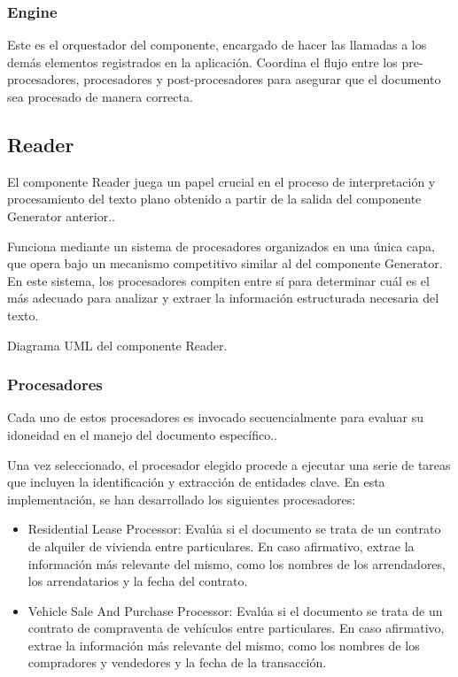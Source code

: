 \subsubsection*{Engine}
Este es el orquestador del componente, encargado de hacer las llamadas a los demás elementos registrados en la
aplicación. Coordina el flujo entre los pre-procesadores, procesadores y post-procesadores para asegurar que el
documento sea procesado de manera correcta.

\subsection*{Reader}
El componente Reader juega un papel crucial en el proceso de interpretación y procesamiento del texto plano obtenido a
partir de la salida del componente Generator anterior..

Funciona mediante un sistema de procesadores organizados en una única capa, que opera bajo un mecanismo competitivo
similar al del componente Generator. En este sistema, los procesadores compiten entre sí para determinar cuál es el más
adecuado para analizar y extraer la información estructurada necesaria del texto.

Diagrama UML del componente Reader.

\subsubsection*{Procesadores}
Cada uno de estos procesadores es invocado secuencialmente para evaluar su idoneidad en el manejo del documento
específico..

Una vez seleccionado, el procesador elegido procede a ejecutar una serie de tareas que incluyen la identificación y
extracción de entidades clave. En esta implementación, se han desarrollado los siguientes procesadores:

\begin{itemize}
    \item Residential Lease Processor: Evalúa si el documento se trata de un contrato de alquiler de vivienda entre
    particulares. En caso afirmativo, extrae la información más relevante del mismo, como los nombres de los
    arrendadores, los arrendatarios y la fecha del contrato.
    \item Vehicle Sale And Purchase Processor: Evalúa si el documento se trata de un contrato de compraventa de
    vehículos
    entre particulares. En caso afirmativo, extrae la información más relevante del mismo, como los nombres de los
    compradores y vendedores y la fecha de la transacción.
\end{itemize}

